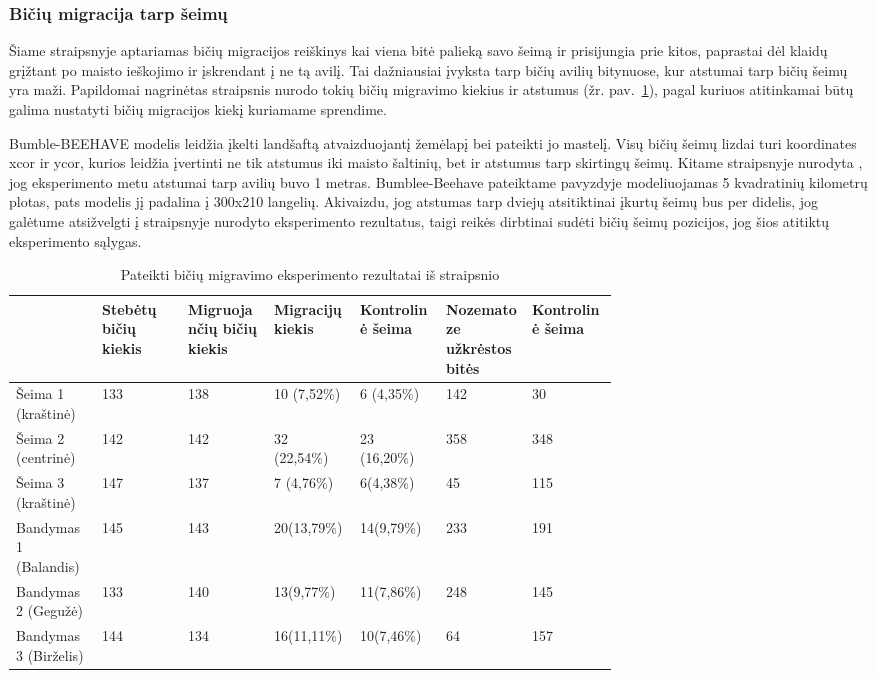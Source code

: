 \documentclass{VUMIFPSmagistrinis}
\begin{document}
\subsubsection[Bi\v{c}i\k{u} migracija tarp \v{s}eim\k{u}]{Bi\v{c}i\k{u} migracija tarp \v{s}eim\k{u}}
Šiame straipsnyje \cite{PfC98} aptariamas bičių migracijos reiškinys kai viena bitė palieką savo šeimą ir prisijungia prie kitos, paprastai dėl klaidų grįžtant po maisto ieškojimo ir įskrendant į ne tą avilį. Tai dažniausiai įvyksta tarp bičių avilių bitynuose, kur atstumai tarp bičių šeimų yra maži. Papildomai nagrinėtas straipsnis \cite{BPC16} nurodo tokių bičių migravimo kiekius ir atstumus (žr. pav.~\ref{tab:tsp}), pagal kuriuos atitinkamai būtų galima nustatyti bičių migracijos kiekį kuriamame sprendime.

Bumble-BEEHAVE modelis leidžia įkelti landšaftą atvaizduojantį žemėlapį bei pateikti jo mastelį. Visų bičių šeimų lizdai turi koordinates xcor ir ycor, kurios leidžia įvertinti ne tik atstumus iki maisto šaltinių, bet ir atstumus tarp skirtingų šeimų. Kitame straipsnyje nurodyta \cite{BPC16}, jog eksperimento metu atstumai tarp avilių buvo 1 metras. Bumblee-Beehave pateiktame pavyzdyje modeliuojamas 5 kvadratinių kilometrų plotas, pats modelis jį padalina į 300x210 langelių. Akivaizdu, jog atstumas tarp dviejų atsitiktinai įkurtų šeimų bus per didelis, jog galėtume atsižvelgti į straipsnyje nurodyto eksperimento rezultatus, taigi reikės dirbtinai sudėti bičių šeimų pozicijos, jog šios atitiktų eksperimento sąlygas. 
\begin{table}[H]\footnotesize
  \centering
  \caption{Pateikti bičių migravimo eksperimento rezultatai iš straipsnio \cite{BPC16}}
  \label{tab:tsp}
  \begin{tabular}{p{0.1\linewidth}p{0.1\linewidth}p{0.1\linewidth}p{0.1\linewidth}p{0.1\linewidth}p{0.1\linewidth}p{0.1\linewidth}} \hline
	 & Stebėtų bičių kiekis&	Migruojančių bičių kiekis&	Migracijų kiekis&	Kontrolinė šeima&	Nozematoze užkrėstos bitės&	Kontrolinė šeima
	 \\
	 \hline
Šeima 1 (kraštinė) &	133 &	138 &	10 (7,52\%) &	6 (4,35\%) &	142&	30 \\
Šeima 2 (centrinė)& 	142& 	142& 	32 (22,54\%)& 	23 (16,20\%)& 	358&	348\\
Šeima 3 (kraštinė)& 	147& 	137&	7 (4,76\%)& 	6(4,38\%)&  	45& 	115\\
Bandymas 1 (Balandis)&	145&	143&	20(13,79\%)&	14(9,79\%)&	    233& 	191\\
Bandymas 2 (Gegužė)&	133&	140&	13(9,77\%)&	    11(7,86\%)&	    248& 	145\\
Bandymas 3 (Birželis)&	144&	134&	16(11,11\%)&	10(7,46\%)&	    64& 	157\\
  \end{tabular}
\end{table}
\end{document}
